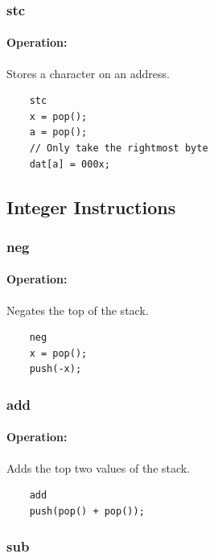 \subsubsection{stc}

\paragraph{Operation:}
Stores a character on an address.

	\begin{lstlisting}
	stc
	x = pop();
	a = pop();
	// Only take the rightmost byte
	dat[a] = 000x;
	\end{lstlisting}

\subsection{Integer Instructions}


\subsubsection{neg}

\paragraph{Operation:}
Negates the top of the stack.

	\begin{lstlisting}
	neg
	x = pop();
	push(-x);
	\end{lstlisting}

\subsubsection{add}

\paragraph{Operation:}
Adds the top two values of the stack.

	\begin{lstlisting}
	add
	push(pop() + pop());
	\end{lstlisting}

\subsubsection{sub}

